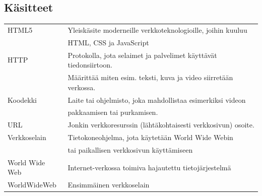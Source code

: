 \documentclass[finnish, 12pt, a4paper, elec, utf8, a-1b, online]{aaltothesis}
\date{8.9.2022}
\begin{document}
\makecoverpage{}

\makecopyrightpage{}

\begin{abstractpage}[finnish]
  \abstracttext{}
\end{abstractpage}


\newpage

\thesistableofcontents


\subsection*{Käsitteet}
\begin{tabular}{ll}
  HTML5           & Yleiskäsite moderneille verkkoteknologioille, joihin kuuluu \\
                  & HTML, CSS ja JavaScript \\
  HTTP            & Protokolla, jota selaimet ja palvelimet käyttävät tiedonsiirtoon. \\
                  & Määrittää miten esim. teksti, kuva ja video siirretään verkossa. \\
  Koodekki        & Laite tai ohjelmisto, joka mahdollistaa esimerkiksi videon \\
                  & pakkaamisen tai purkamisen. \\
  URL             & Jonkin verkkoresurssin (lähtäkohtaisesti verkkosivun) osoite.\\
  Verkkoselain    & Tietokoneohjelma, jota käytetään World Wide Webin \\
                  & tai paikallisen verkkosivun käyttämiseen \\
  World Wide Web  & Internet-verkossa toimiva hajautettu tietojärjestelmä \\
  WorldWideWeb    & Ensimmäinen verkkoselain
\end{tabular}
\end{document}
